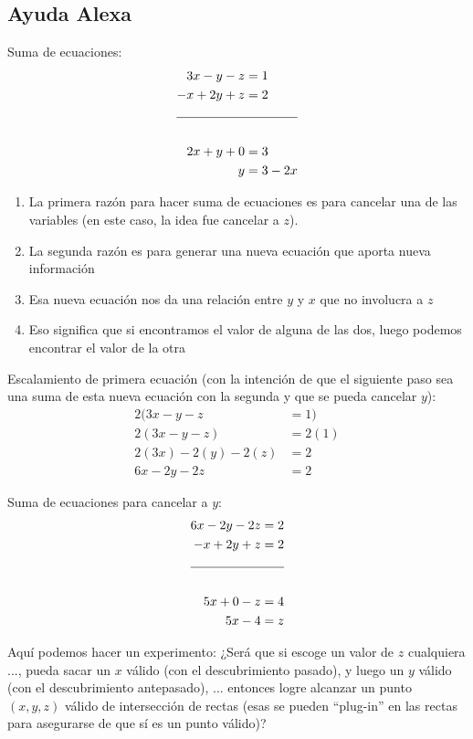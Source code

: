 \documentclass[12pt,oneside]{book}
\begin{document}
\subsection*{Ayuda Alexa}

Suma de ecuaciones:
\begin{align*}
  3x -  y - z &= 1 \\
  -x + 2y + z &= 2 \\
  \cline{1-2} \\
  2x + y + 0 &= 3 \\
  y &= 3 - 2x
\end{align*}

\begin{enumerate}
  \item La primera razón para hacer suma de ecuaciones es para cancelar una de las variables (en este caso, la idea fue cancelar a $z$).
  \item La segunda razón es para generar una nueva ecuación que aporta nueva información
  \item Esa nueva ecuación nos da una relación entre $y$ y $x$ que no involucra a $z$
  \item Eso significa que si encontramos el valor de alguna de las dos, luego podemos encontrar el valor de la otra
\end{enumerate}

Escalamiento de primera ecuación (con la intención de que el siguiente paso sea una suma de esta nueva ecuación con la segunda y que se pueda cancelar $y$):
\begin{align*}
  2(3x -  y - z &= 1) \\
  2(3x -  y - z) &= 2(1) \\
  2(3x) -  2(y) - 2(z) &= 2 \\
  6x -  2y - 2z &= 2
\end{align*}

Suma de ecuaciones para cancelar a $y$:
\begin{align*}
  6x -  2y - 2z &= 2 \\
  -x + 2y + z &= 2 \\
  \cline{1-2} \\
  5x + 0 - z &= 4 \\
  5x - 4 &= z
\end{align*}

Aquí podemos hacer un experimento:
¿Será que si escoge un valor de $z$ cualquiera $...$, pueda sacar un $x$ válido (con el descubrimiento pasado), y luego un $y$ válido (con el descubrimiento antepasado), $...$ entonces logre alcanzar un punto $(x, y, z)$ válido de intersección de rectas (esas se pueden ``plug-in'' en las rectas para asegurarse de que sí es un punto válido)?
\end{document}
